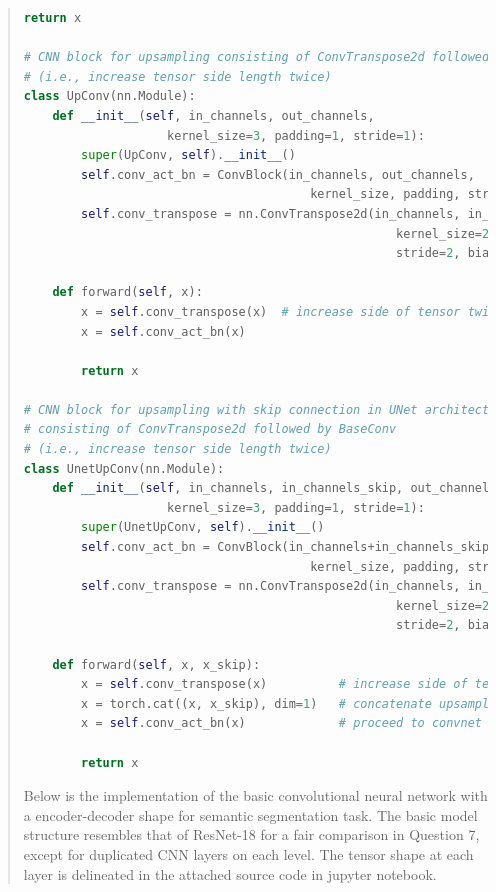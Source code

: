 \documentclass[9pt]{article}
\begin{document}
\begin{quote}
\begin{lstlisting}[language=Python, basicstyle=\scriptsize]
        return x

# CNN block for upsampling consisting of ConvTranspose2d followed by BaseConv 
# (i.e., increase tensor side length twice)
class UpConv(nn.Module):
    def __init__(self, in_channels, out_channels, 
                    kernel_size=3, padding=1, stride=1):
        super(UpConv, self).__init__()
        self.conv_act_bn = ConvBlock(in_channels, out_channels, 
                                        kernel_size, padding, stride)
        self.conv_transpose = nn.ConvTranspose2d(in_channels, in_channels, 
                                                    kernel_size=2, padding=0, 
                                                    stride=2, bias=False)
        
    def forward(self, x):
        x = self.conv_transpose(x)  # increase side of tensor twice
        x = self.conv_act_bn(x)

        return x

# CNN block for upsampling with skip connection in UNet architecture, 
# consisting of ConvTranspose2d followed by BaseConv 
# (i.e., increase tensor side length twice)
class UnetUpConv(nn.Module):
    def __init__(self, in_channels, in_channels_skip, out_channels, 
                    kernel_size=3, padding=1, stride=1):
        super(UnetUpConv, self).__init__()
        self.conv_act_bn = ConvBlock(in_channels+in_channels_skip, out_channels, 
                                        kernel_size, padding, stride)
        self.conv_transpose = nn.ConvTranspose2d(in_channels, in_channels, 
                                                    kernel_size=2, padding=0, 
                                                    stride=2, bias=False)
        
    def forward(self, x, x_skip):
        x = self.conv_transpose(x)          # increase side of tensor twice
        x = torch.cat((x, x_skip), dim=1)   # concatenate upsampled and skipped tensor
        x = self.conv_act_bn(x)             # proceed to convnet operation

        return x
\end{lstlisting}

Below is the implementation of the basic convolutional neural network with a encoder-decoder shape for semantic segmentation task. The basic model structure resembles that of ResNet-18 for a fair comparison in Question 7, except for duplicated CNN layers on each level. The tensor shape at each layer is delineated in the attached source code in jupyter notebook.


\end{quote}
\end{document}
